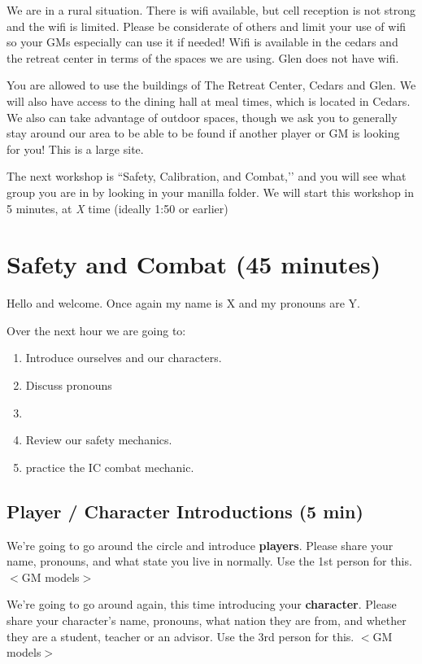 \documentclass[green]{GL2020}
\begin{document}
We are in a rural situation.  There is wifi available, but cell reception is not strong and the wifi is limited.  Please be considerate of others and limit your use of wifi so your GMs especially can use it if needed!  Wifi is available in the cedars and the retreat center in terms of the spaces we are using.  Glen does not have wifi.

You are allowed to use the buildings of The Retreat Center, Cedars and Glen.  We will also have access to the dining hall at meal times, which is located in Cedars.  We also can take advantage of outdoor spaces, though we ask you to generally stay around our area to be able to be found if another player or GM is looking for you!  This is a large site.

The next workshop is ``Safety, Calibration, and Combat,’’ and you will see what group you are in by looking in your manilla folder.  We will start this workshop in 5 minutes, at \emph{X} time (ideally 1:50 or earlier)

\section*{Safety and Combat (45 minutes)}
Hello and welcome. Once again my name is X and my pronouns are Y.

Over the next hour we are going to:
\begin{enumerate}
	\item Introduce ourselves and our characters.
	\item Discuss pronouns
	\item
	\item Review our safety mechanics.
	\item practice the IC combat mechanic.
\end{enumerate}

\subsection*{Player / Character Introductions (5 min)}
We’re going to go around the circle and introduce \textbf{players}. Please share your name, pronouns, and what state you live in normally. Use the 1st person for this. $<$GM models$>$

We’re going to go around again, this time introducing your \textbf{character}. Please share your character’s name, pronouns, what nation they are from, and whether they are a student, teacher or an advisor. Use the 3rd person for this. $<$GM models$>$
\end{document}

